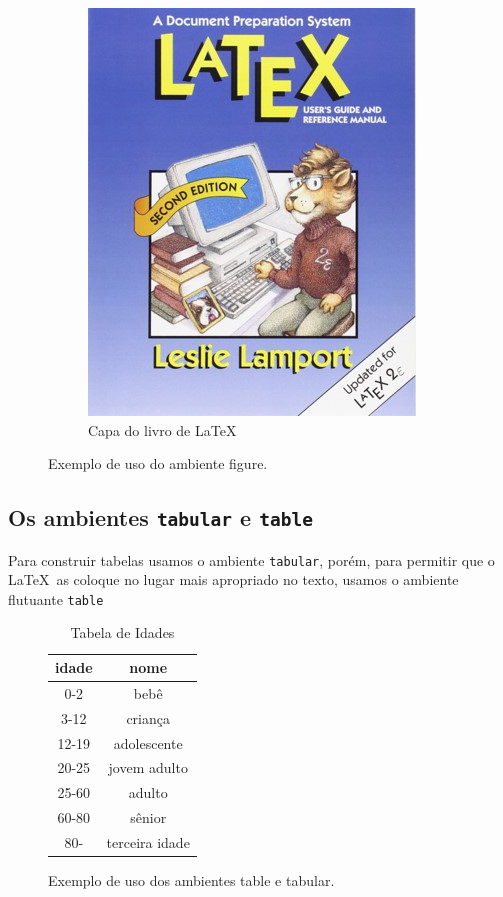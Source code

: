 \begin{figure}[hbt]
    \begin{LTXexample}[pos=b]
\begin{figure}
\centering
\includegraphics[height=0.3\textheight]{Images/Picture6}
\caption{Capa do livro de \LaTeX\ }
\label{fig:picture6}
\end{figure}
    \end{LTXexample}
    \caption{Exemplo de uso do ambiente figure.}
    \label{fig:fig}
\end{figure}

\subsection{Os ambientes \lstinline|tabular| e \lstinline|table|}

Para construir tabelas usamos o ambiente \lstinline|tabular|, porém, para permitir que o \LaTeX\ as coloque no lugar mais apropriado no texto, usamos o ambiente flutuante \lstinline|table|

\begin{figure}[hbt]
    \begin{LTXexample}[pos=b]
    \begin{table}
    \caption{Tabela de Idades}
    \centering
    \label{tab:idades}
    \begin{tabular}{|c|c|}
    \hline
    \textbf{idade} & \textbf{nome} \\
    \hline
    0-2   & bebê \\
    3-12  & criança \\
    12-19 & adolescente \\
    20-25 & jovem adulto \\
    25-60 & adulto \\
    60-80 & sênior \\
    80-   & terceira idade \\
    \hline
    \end{tabular}
    \end{table}
    \end{LTXexample}
    \caption{Exemplo de uso dos ambientes table e tabular.}
\label{fig:tabtab}
\end{figure}

